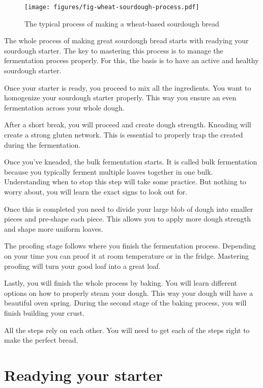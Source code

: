 \begin{figure}[!htb]
  \texttt{[image: figures/fig-wheat-sourdough-process.pdf]}
  \caption{The typical process of making a wheat-based sourdough bread}
  \label{fig:wheat-sourdough-process}
\end{figure}

The whole process of making great sourdough bread starts with
readying your sourdough starter. The key to mastering
this process is to manage the fermentation process properly.
For this, the basis is to have an active and healthy
sourdough starter.

Once your starter is ready, you proceed to mix all the ingredients.
You want to homogenize your sourdough starter properly. This
way you ensure an even fermentation across your whole dough.

After a short break, you will proceed and create dough strength.
Kneading will create a strong gluten network. This is essential
to properly trap the  created during the fermentation.

Once you've kneaded, the bulk fermentation starts. It is called bulk fermentation
because you typically ferment multiple loaves together in one bulk.
Understanding when to stop this step will take some practice.
But nothing to worry about, you will learn the exact signs to look out for.

Once this is completed you need to divide your large blob of
dough into smaller pieces and pre-shape each piece. This allows
you to apply more dough strength and shape more uniform loaves.

The proofing stage follows where you finish the fermentation process.
Depending on your time you can proof it at room temperature or in the fridge.
Mastering proofing will turn your good loaf into a great loaf.

Lastly, you will finish the whole process by baking. You will learn different
options on how to properly steam your dough. This way your
dough will have a beautiful oven spring. During the second
stage of the baking process, you will finish building your crust.

All the steps rely on each other. You will need to get each of
the steps right to make the perfect bread.

\section{Readying your starter}
\label{section:readying-starter}

